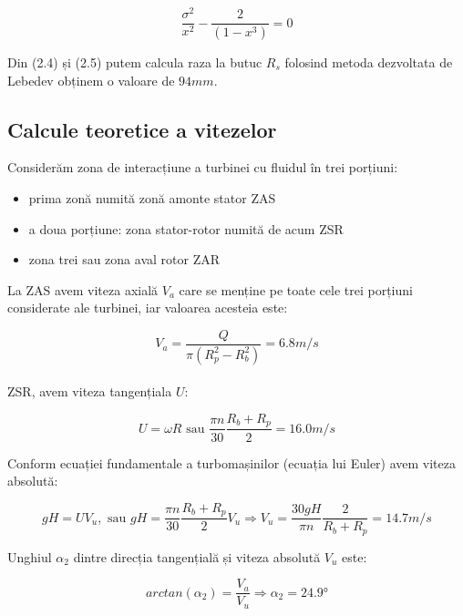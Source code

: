 \begin{equation}
\frac{\sigma^2}{x^2} - \frac{2}{(1-x^3)} = 0
\end{equation}

Din (2.4) și (2.5) putem calcula raza la butuc $R_{s}$ folosind metoda dezvoltata de Lebedev \cite{lebedev1991formulae} obținem o valoare de $94\si{mm}$.

\clearpage


\subsection{Calcule teoretice a vitezelor}

Considerăm zona de interacțiune a turbinei cu fluidul în trei porțiuni:
\begin{itemize}
	\item prima zonă numită zonă amonte stator ZAS
	\item a doua porțiune: zona stator-rotor numită de acum ZSR
	\item zona trei sau zona aval rotor ZAR
\end{itemize}

La ZAS avem viteza axială $V_{a}$ care se menține pe toate cele trei porțiuni considerate ale turbinei, iar valoarea acesteia este:

\begin{equation}
V_a=\frac{Q}{\pi(R_{p}^2-R_{b}^2)}=6.8\si{m/s}
\end{equation}\\

 ZSR, avem viteza tangențiala $U$:

\begin{equation}
U=\omega R \text{ sau } \frac{\pi n}{30} \frac{R_{b} + R_{p}}{2}=16.0\si{m/s}
\end{equation}

Conform ecuației fundamentale a turbomașinilor (ecuația lui Euler) avem viteza absolută:

\begin{equation}
gH=UV_{u}, \text{ sau } gH=\frac{\pi n}{30} \frac{R_{b}+R_{p}}{2} V_{u} \Rightarrow V_{u} = \frac{30gH}{\pi n} \frac{2}{R_{b}+R_{p}} = 14.7\si{m/s}
\end{equation}


Unghiul $\alpha_2$ dintre direcția tangențială și viteza absolută $V_u$ este:

\begin{equation}
arctan(\alpha_{2 })=\frac{V_{a}}{V_{u}} \Rightarrow \alpha_{2}=24.9\si{\degree}
\end{equation}



